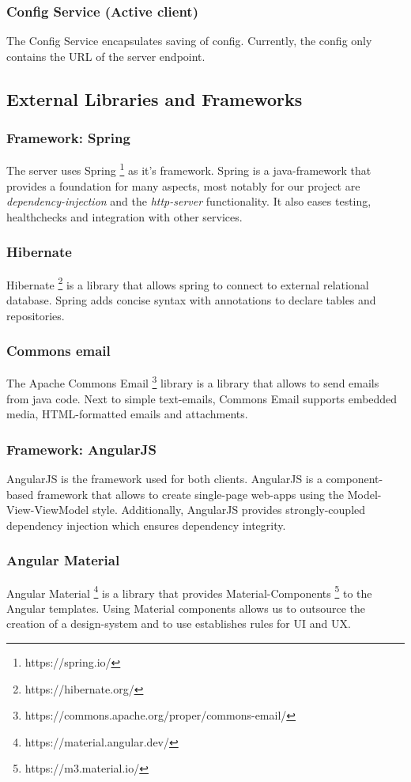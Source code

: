 \subsubsection{Config Service (Active client)}
The Config Service encapsulates saving of config. \newline
Currently, the config only contains the URL of the server endpoint.

\subsection{External Libraries and Frameworks}\label{subsec:external-libraries-and-frameworks}
\subsubsection{Framework: Spring}
The server uses Spring \footnote{https://spring.io/} as it's framework.
Spring is a java-framework that provides a foundation for many aspects, most notably for our project are \textit{dependency-injection} and the \textit{http-server} functionality.
It also eases testing, healthchecks and integration with other services.

\subsubsection{Hibernate}
Hibernate \footnote{https://hibernate.org/} is a library that allows spring to connect to external relational database.
Spring adds concise syntax with annotations to declare tables and repositories.

\subsubsection{Commons email}
The Apache Commons Email \footnote{https://commons.apache.org/proper/commons-email/} library is a library that allows to send emails from java code.
Next to simple text-emails, Commons Email supports embedded media, HTML-formatted emails and attachments.

\subsubsection{Framework: AngularJS}
AngularJS is the framework used for both clients. \newline
AngularJS is a component-based framework that allows to create single-page web-apps using the Model-View-ViewModel style.
Additionally, AngularJS provides strongly-coupled dependency injection which ensures dependency integrity.

\subsubsection{Angular Material}
Angular Material \footnote{https://material.angular.dev/} is a library that provides Material-Components \footnote{https://m3.material.io/} to the Angular templates.
Using Material components allows us to outsource the creation of a design-system and to use establishes rules for UI and UX.